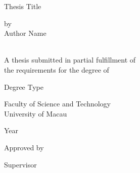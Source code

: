 \newpage
\thispagestyle{empty}
\begin{titlepage}
  \begin{center}
    Thesis Title\\
    \begin{spacing}{2}
      by\\
      Author Name\\\
    \end{spacing}
    \begin{spacing}{1}
      A thesis submitted in partial fulfillment of\\
      the requirements for the degree of\\
    \end{spacing}
    \bigskip
    \bigskip
    Degree Type\\
    \bigskip
    \bigskip
    \begin{spacing}{1}
      Faculty of Science and Technology\\
      University of Macau\\
    \end{spacing}
    \bigskip
    \bigskip
    Year
  \end{center}
  \vfill
  Approved by \hrulefill\\ %
  \centerline{Supervisor}
  \hphantom{invisible line}\\
  \bigskip
  \hphantom{Approved by} \hrulefill\\
  \bigskip
  \hphantom{Approved by} \hrulefill\\
  \bigskip
  \hphantom{Approved by} \hrulefill\\

\end{titlepage}
